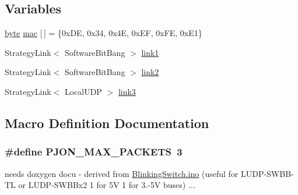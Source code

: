 \subsection*{Variables}
\begin{DoxyCompactItemize}
\item 
\hyperlink{Arduino_8h_ab8ef12fab634c171394422d0ee8baf94}{byte} \hyperlink{BlinkingSwitch__3way_8ino_aea3f7775fecafb66a619eb2dcb0357bd}{mac} \mbox{[}$\,$\mbox{]} = \{0x\-D\-E, 0x34, 0x4\-E, 0x\-E\-F, 0x\-F\-E, 0x\-E1\}
\item 
Strategy\-Link$<$ Software\-Bit\-Bang $>$ \hyperlink{BlinkingSwitch__3way_8ino_ae2f4f4a5ca9a8a627a5132d1868bf5c0}{link1}
\item 
Strategy\-Link$<$ Software\-Bit\-Bang $>$ \hyperlink{BlinkingSwitch__3way_8ino_a6ab0c6e3e6ae04f06e58b38531729623}{link2}
\item 
Strategy\-Link$<$ Local\-U\-D\-P $>$ \hyperlink{BlinkingSwitch__3way_8ino_ad4e8fc0fe300da7ae962f45bc8357a3b}{link3}
\end{DoxyCompactItemize}


\subsection{Macro Definition Documentation}
\hypertarget{BlinkingSwitch__3way_8ino_af093da5eac99580be6ba61b4dc79f2c1}{
\subsubsection[{P\-J\-O\-N\-\_\-\-M\-A\-X\-\_\-\-P\-A\-C\-K\-E\-T\-S}]{\setlength{\rightskip}{0pt plus 5cm}\#define P\-J\-O\-N\-\_\-\-M\-A\-X\-\_\-\-P\-A\-C\-K\-E\-T\-S~3}}\label{BlinkingSwitch__3way_8ino_af093da5eac99580be6ba61b4dc79f2c1}
needs doxygen docu -\/ derived from \hyperlink{BlinkingSwitch_8ino}{Blinking\-Switch.\-ino} (useful for L\-U\-D\-P-\/\-S\-W\-B\-B-\/\-T\-L or L\-U\-D\-P-\/\-S\-W\-B\-Bx2 1 for 5\-V 1 for 3.-\/5\-V buses) ... 

